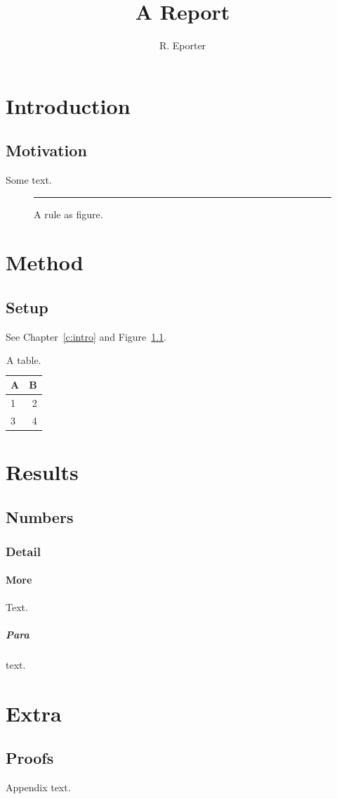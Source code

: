 \documentclass[11pt]{report}
\begin{document}
\title{A Report}\author{R. Eporter}\maketitle
\tableofcontents\listoffigures\listoftables
\chapter{Introduction}\section{Motivation}Some text.\label{c:intro}
\begin{figure}[ht]\centering\rule{4cm}{2cm}\caption{A rule as figure.}\label{fig:r}\end{figure}
\chapter{Method}\section{Setup}See Chapter~\ref{c:intro} and Figure~\ref{fig:r}.
\begin{table}[ht]\centering\caption{A table.}\begin{tabular}{lr}\toprule A&B\\\midrule 1&2\\ 3&4\\\bottomrule\end{tabular}\end{table}
\chapter{Results}\section{Numbers}\subsection{Detail}\subsubsection{More}Text.\paragraph{Para}text.
\appendix\chapter{Extra}\section{Proofs}Appendix text.
\end{document}
